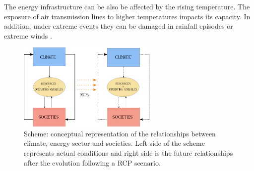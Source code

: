 The energy infrastructure can be also be affected by the rising temperature. The exposure of air transmission lines to higher temperatures impacts its capacity. In addition, under extreme events they can be damaged in rainfall episodes or extreme winds \cite*{Troccoli2018}. 


\begin{figure}[h!]
\centering\includegraphics[width=0.6\textwidth]{figs/drawing.pdf}
\caption[Conceptual scheme: climate, energy and societies interactions]{Scheme: conceptual representation of the relationships between climate, energy sector and societies. Left side of the scheme represents actual conditions and right side is the future relationships after the evolution following a RCP scenario. }
\label{fig:feedback}
\end{figure}

 



